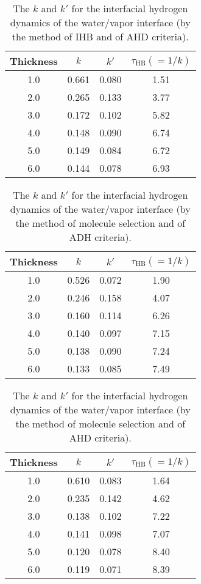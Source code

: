 {\begin{table}[htb]
\end{table}
\begin{table}[htb]
\centering
\caption{\label{tab:k_k_prime_tau_128w_pure_ihb_AHD} 
    The $k$ and $k'$ for the interfacial hydrogen dynamics of the water/vapor interface (by the method of IHB and of AHD criteria).} 
\begin{tabular}{cccc}
 Thickness & $k$ & $k'$ & $\tau_{\text{HB}} (=1/k)$ \\
\hline
  1.0 & 0.661 & 0.080 & 1.51  \\
  2.0 & 0.265 & 0.133 & 3.77  \\
  3.0 & 0.172 & 0.102 & 5.82  \\
  4.0 & 0.148 & 0.090 & 6.74  \\
  5.0 & 0.149 & 0.084 & 6.72  \\
  6.0 & 0.144 & 0.078 & 6.93  \\
\end{tabular}
\end{table}

\begin{table}[H]
\centering
\caption{\label{tab:k_k_prime_tau_128w_pure_ihb_scheme1_ADH} 
    The $k$ and $k'$ for the interfacial hydrogen dynamics of the water/vapor interface (by the method of molecule selection and of ADH criteria).} 
\begin{tabular}{cccc}
 Thickness & $k$ & $k'$ & $\tau_{\text{HB}} (=1/k)$ \\
\hline
  1.0 & 0.526 & 0.072 & 1.90  \\
  2.0 & 0.246 & 0.158 & 4.07  \\
  3.0 & 0.160 & 0.114 & 6.26  \\
  4.0 & 0.140 & 0.097 & 7.15  \\
  5.0 & 0.138 & 0.090 & 7.24  \\
  6.0 & 0.133 & 0.085 & 7.49  \\
\end{tabular}
\end{table}
\begin{table}[H]
\centering
\caption{\label{tab:k_k_prime_tau_128w_pure_ihb_AHD} 
    The $k$ and $k'$ for the interfacial hydrogen dynamics of the water/vapor interface (by the method of molecule selection and of AHD criteria).} 
\begin{tabular}{cccc}
 Thickness & $k$ & $k'$ & $\tau_{\text{HB}} (=1/k)$ \\
\hline
  1.0 & 0.610 & 0.083 & 1.64  \\
  2.0 & 0.235 & 0.142 & 4.62  \\
  3.0 & 0.138 & 0.102 & 7.22  \\
  4.0 & 0.141 & 0.098 & 7.07  \\
  5.0 & 0.120 & 0.078 & 8.40  \\
  6.0 & 0.119 & 0.071 & 8.39  \\
\end{tabular}
\end{table}

}
